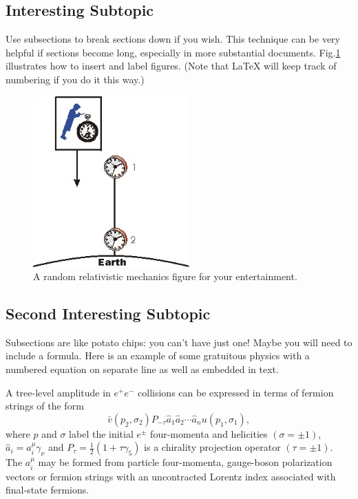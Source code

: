 \documentclass[twocolumn,12pt]{article}
\begin{document}
\subsection{Interesting Subtopic}

Use subsections to break sections down if you wish.  This technique can be very helpful if sections become long, especially in more substantial documents. Fig.\ref{dilate} illustrates how to insert and label figures.  (Note that LaTeX will keep track of numbering if you do it this way.) 

\begin{figure}[ht]
\begin{center}
\includegraphics[width=6cm]{TimeDilation5.jpg}
\caption{A random relativistic mechanics figure for your entertainment. \cite{c-ref}}
\label{dilate}
\end{center}
\end{figure}

\subsection{Second Interesting Subtopic}

Subsections are like potato chips:  you can't have just one!  Maybe you will need to include a formula.  Here is an example of some gratuitous physics with a numbered equation on separate line as well as embedded in text.

A tree-level amplitude in $e^+e^-$ collisions can be expressed in
terms of fermion strings of the form
\begin{equation}
\bar v(p_2,\sigma_2)P_{-\tau}\hat a_1\hat a_2\cdots
\hat a_nu(p_1,\sigma_1) ,
\end{equation}
where $p$ and $\sigma$ label the initial $e^{\pm}$ four-momenta
and helicities $(\sigma = \pm 1)$, $\hat a_i=a^\mu_i\gamma_\nu$
and $P_\tau=\frac{1}{2}(1+\tau\gamma_5)$ is a chirality projection
operator $(\tau = \pm1)$.  The $a^\mu_i$ may be formed from particle
four-momenta, gauge-boson polarization vectors or fermion strings with
an uncontracted Lorentz index associated with final-state fermions.
\end{document}
